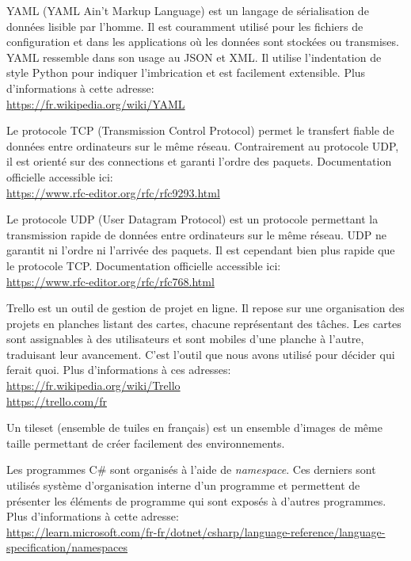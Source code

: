 \documentclass[a4paper]{article}
\begin{document}
\begin{thebibliography}{}
	YAML (YAML Ain't Markup Language) est un langage de sérialisation de données lisible par l'homme. Il est couramment utilisé pour les fichiers de configuration et dans les applications où les données sont stockées ou transmises. YAML ressemble dans son usage au JSON et XML. Il utilise l'indentation de style Python pour indiquer l'imbrication et est facilement extensible. Plus d'informations à cette adresse: \\
    \url{https://fr.wikipedia.org/wiki/YAML}
    
    Le protocole TCP (Transmission Control Protocol) permet le transfert fiable de données entre ordinateurs sur le même réseau. Contrairement au protocole UDP, il est orienté sur des connections et garanti l'ordre des paquets. Documentation officielle accessible ici: \\
    \url{https://www.rfc-editor.org/rfc/rfc9293.html}
    
    Le protocole UDP (User Datagram Protocol) est un protocole permettant la transmission rapide de données entre ordinateurs sur le même réseau. UDP ne garantit ni l'ordre ni l'arrivée des paquets. Il est cependant bien plus rapide que le protocole TCP. Documentation officielle accessible ici: \\
    \url{https://www.rfc-editor.org/rfc/rfc768.html}
    
	Trello est un outil de gestion de projet en ligne. Il repose sur une organisation des projets en planches listant des cartes, chacune représentant des tâches. Les cartes sont assignables à des utilisateurs et sont mobiles d'une planche à l'autre, traduisant leur avancement. C'est l'outil que nous avons utilisé pour décider qui ferait quoi. Plus d'informations à ces adresses: \\
    \url{https://fr.wikipedia.org/wiki/Trello} \\
    \url{https://trello.com/fr}
    
	Un tileset (ensemble de tuiles en français) est un ensemble d'images de même taille permettant de créer facilement des environnements.
    
  Les programmes C\# sont organisés à l’aide de \textit{namespace}. Ces derniers sont utilisés système d’organisation interne d'un programme et permettent de présenter les éléments de programme qui sont exposés à d’autres programmes. Plus d'informations à cette adresse: \\
  \url{https://learn.microsoft.com/fr-fr/dotnet/csharp/language-reference/language-specification/namespaces}

\end{thebibliography}
\end{document}
